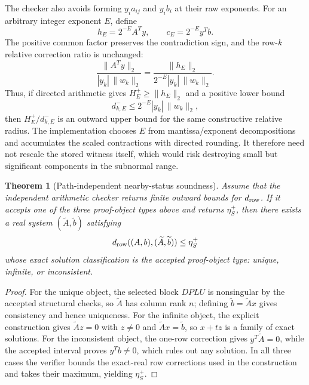 \documentclass[11pt]{article}
\newtheorem{theorem}{Theorem}[section]
\theoremstyle{definition}
\begin{document}
The checker also avoids forming $y_i a_{ij}$ and $y_i b_i$ at their raw exponents. For an arbitrary integer exponent $E$, define
\[
 h_E=2^{-E}A^Ty,\qquad c_E=2^{-E}y^Tb.
\]
The positive common factor preserves the contradiction sign, and the row-$k$ relative correction ratio is unchanged:
\[
 \frac{\|A^Ty\|_2}{|y_k|\,\|w_k\|_2}
 =\frac{\|h_E\|_2}{2^{-E}|y_k|\,\|w_k\|_2}.
\]
Thus, if directed arithmetic gives $H_E^+\ge\|h_E\|_2$ and a positive lower bound
\[
 d_{k,E}^-\le 2^{-E}|y_k|\,\|w_k\|_2,
\]
then $H_E^+/d_{k,E}^-$ is an outward upper bound for the same constructive relative radius. The implementation chooses $E$ from mantissa/exponent decompositions and accumulates the scaled contractions with directed rounding. It therefore need not rescale the stored witness itself, which would risk destroying small but significant components in the subnormal range.

\begin{theorem}[Path-independent nearby-status soundness]\label{thm:status-soundness}
Assume that the independent arithmetic checker returns finite outward bounds for $d_{\rm row}$. If it accepts one of the three proof-object types above and returns $\eta_S^+$, then there exists a real system $(\widetilde A,\widetilde b)$ satisfying
\[
d_{\rm row}((A,b),(\widetilde A,\widetilde b))\le\eta_S^+
\]
whose exact solution classification is the accepted proof-object type: unique, infinite, or inconsistent.
\end{theorem}

\begin{proof}
For the unique object, the selected block $DPLU$ is nonsingular by the accepted structural checks, so $\widetilde A$ has column rank $n$; defining $\widetilde b=\widetilde A x$ gives consistency and hence uniqueness. For the infinite object, the explicit construction gives $\widetilde A z=0$ with $z\ne0$ and $\widetilde A x=\widetilde b$, so $x+t z$ is a family of exact solutions. For the inconsistent object, the one-row correction gives $y^T\widetilde A=0$, while the accepted interval proves $y^Tb\ne0$, which rules out any solution. In all three cases the verifier bounds the exact-real row corrections used in the construction and takes their maximum, yielding $\eta_S^+$.
\end{proof}
\end{document}
